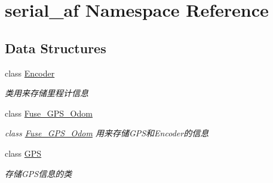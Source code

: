 \hypertarget{namespaceserial__af}{}\section{serial\+\_\+af Namespace Reference}
\label{namespaceserial__af}
\subsection*{Data Structures}
\begin{DoxyCompactItemize}
\item 
class \hyperlink{classserial__af_1_1_encoder}{Encoder}
\begin{DoxyCompactList}\small\item\em 类用来存储里程计信息 \end{DoxyCompactList}\item 
class \hyperlink{classserial__af_1_1_fuse___g_p_s___odom}{Fuse\+\_\+\+G\+P\+S\+\_\+\+Odom}
\begin{DoxyCompactList}\small\item\em class \hyperlink{classserial__af_1_1_fuse___g_p_s___odom}{Fuse\+\_\+\+G\+P\+S\+\_\+\+Odom} 用来存储\+G\+P\+S和\+Encoder的信息 \end{DoxyCompactList}\item 
class \hyperlink{classserial__af_1_1_g_p_s}{G\+PS}
\begin{DoxyCompactList}\small\item\em 存储\+G\+P\+S信息的类 \end{DoxyCompactList}\end{DoxyCompactItemize}
